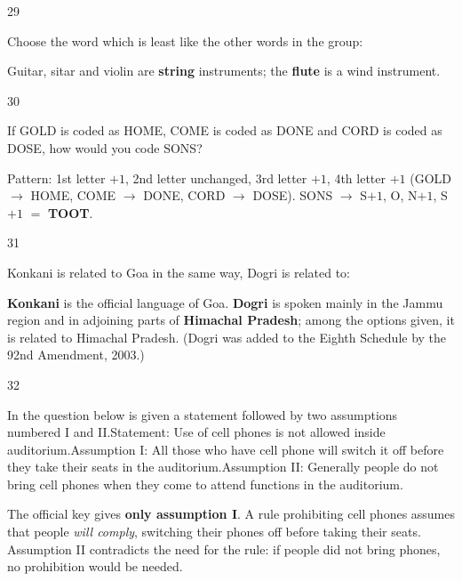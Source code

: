 \begin{question}{29}
{Choose the word which is least like the other words in the group:\par}
\begin{explain}
Guitar, sitar and violin are \textbf{string} instruments; the \textbf{flute} is a wind instrument.
\end{explain}
\end{question}

\begin{question}{30}
{If GOLD is coded as HOME, COME is coded as DONE and CORD is coded as DOSE, how would you code SONS?\par}
\begin{explain}
Pattern: 1st letter $+1$, 2nd letter unchanged, 3rd letter $+1$, 4th letter $+1$ (GOLD $\rightarrow$ HOME, COME $\rightarrow$ DONE, CORD $\rightarrow$ DOSE).
SONS $\rightarrow$ S$+1$, O, N$+1$, S$+1$ $=$ \textbf{TOOT}.
\end{explain}
\end{question}

\begin{question}{31}
{Konkani is related to Goa in the same way, Dogri is related to:\par}
\begin{explain}
\textbf{Konkani} is the official language of Goa. \textbf{Dogri} is spoken mainly in the Jammu region and in adjoining parts of \textbf{Himachal Pradesh}; among the options given, it is related to Himachal Pradesh. (Dogri was added to the Eighth Schedule by the 92nd Amendment, 2003.)
\end{explain}
\end{question}

\begin{question}{32}
{In the question below is given a statement followed by two assumptions numbered I and II.\newline Statement: Use of cell phones is not allowed inside auditorium.\newline Assumption I: All those who have cell phone will switch it off before they take their seats in the auditorium.\newline Assumption II: Generally people do not bring cell phones when they come to attend functions in the auditorium.\par}
\begin{explain}
The official key gives \textbf{only assumption I}. A rule prohibiting cell phones assumes that people \emph{will comply}, switching their phones off before taking their seats. Assumption II contradicts the need for the rule: if people did not bring phones, no prohibition would be needed.
\end{explain}
\end{question}

